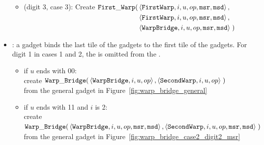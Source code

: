 \begin{itemize}
\begin{itemize}
                \item (digit 3, case 3): Create
                $\begin{aligned}[t]
                    {\tt First\_Warp}(& \left\langle {\tt FirstWarp},  i, u, op, {\tt msr}, {\tt msd} \right\rangle, \\
                               & \left\langle {\tt FirstWarp},  i, u, op, {\tt msr}, {\tt msd} \right\rangle, \\
                               & \left\langle {\tt WarpBridge}, i, u, op, {\tt msr}, {\tt msd} \right\rangle \;)
                \end{aligned}$
                \vspace{.5cm}

            \end{itemize}
        \vspace{.5cm}

        \item {\warpbridge}: a {\warpbridge} gadget binds the last tile of the {\firstwarp} gadgets to the
             first tile of the {\secondwarp} gadgets. For digit 1 in cases 1 and 2, the
             {\warpbridge} is omitted from the {\warpunit}.

        \begin{itemize}

            \item if $u$ ends with 00:\\
            create
            $\begin{aligned}[t]
                {\tt Warp\_Bridge}(& \left\langle {\tt WarpBridge}, i, u, op \right\rangle,
                              \left\langle {\tt SecondWarp}, i, u, op \right\rangle \;)
            \end{aligned}$ \\ from the general gadget in Figure~\ref{fig:warp_bridge_general}
            \vspace{.5cm}

            \item if $u$ ends with 11 and $i$ is 2: \\
            create
            $\begin{aligned}[t]
                {\tt Warp\_Bridge}(& \left\langle {\tt WarpBridge}, i, u, op, {\tt msr}, {\tt msd} \right\rangle,
                              \left\langle {\tt SecondWarp}, i, u, op, {\tt msr}, {\tt msd} \right\rangle \;)
            \end{aligned}$ \\ from the general gadget in Figure~\ref{fig:warp_bridge_case2_digit2_msr}
            \vspace{.5cm}


\end{itemize}
\end{itemize}
